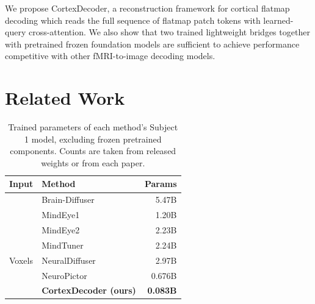 \documentclass[letterpaper]{article} %
\begin{document}
We propose CortexDecoder, a reconstruction framework for cortical flatmap decoding which reads the full sequence of flatmap patch tokens with learned-query cross-attention. We also show that two trained lightweight bridges together with pretrained frozen foundation models are sufficient to achieve performance competitive with other fMRI-to-image decoding models.

\section{Related Work}
\label{sec:related_works}
\begin{table}[h]
\centering
\small
\setlength{\tabcolsep}{3pt}
\begin{tabular}{@{}llr@{}}
\toprule
\textbf{Input} & \textbf{Method} & \textbf{Params} \\
\midrule
& Brain-Diffuser \cite{ozcelik2023brain} & 5.47B \\
& MindEye1 \cite{scotti2023reconstructingmindseyefmritoimage} & 1.20B \\
& MindEye2 \cite{scotti2024mindeye2sharedsubjectmodelsenable} & 2.23B \\
& MindTuner \cite{gong2024mindtunercrosssubjectvisualdecoding} & 2.24B \\
\multirow{-5}{*}{Voxels} & NeuralDiffuser \cite{Li_2025} & 2.97B \\
\midrule
& NeuroPictor \cite{huo2024neuropictorrefiningfmritoimagereconstruction} & 0.676B \\
\rowcolor{oursrow}
\cellcolor{white}\multirow{-2}{*}{Flatmap} & \textbf{CortexDecoder (ours)} & \textbf{0.083B} \\
\bottomrule
\end{tabular}
\caption{Trained parameters of each method's Subject 1 model, excluding frozen pretrained components. Counts are taken from released weights or from each paper.}
\label{tab:params}
\end{table}
\end{document}
